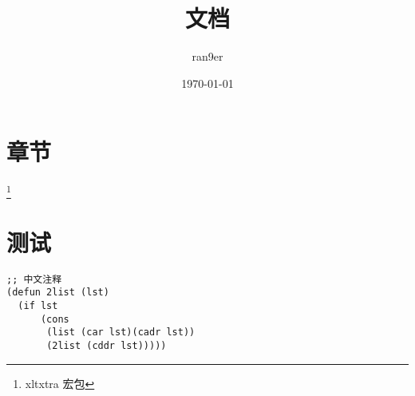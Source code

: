 \documentclass{myclass}
\begin{document}
\title{文档}
\author{ran9er}
\date{\today}

\maketitle

\tableofcontents
\newpage

\section{章节}
\XeTeX\footnote{xltxtra 宏包} 

\section{测试}
\begin{lstlisting}
;; 中文注释
(defun 2list (lst)
  (if lst
      (cons
       (list (car lst)(cadr lst))
       (2list (cddr lst)))))
\end{lstlisting}
\end{document}
